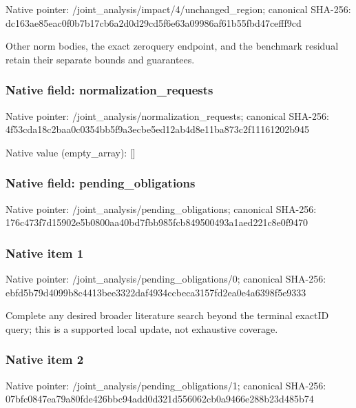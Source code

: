 \documentclass[10pt,a4paper]{article}
\begin{document}
Native pointer: /joint\_analysis/impact/4\allowbreak{}/unchanged\_region; canonical SHA-256: dc163ae85eac0f0b7b17cb6a\allowbreak{}2d0d29cd5f6e63a09986af61\allowbreak{}b55fbd47cefff9cd


Other norm bodies, the exact zeroquery endpoint, and the benchmark residual retain their separate bounds and guarantees.


\subsubsection{Native field: normalization\_requests}


Native pointer: /joint\_analysis/normalization\_requests; canonical SHA-256: 4f53cda18c2baa0c0354bb5f\allowbreak{}9a3ecbe5ed12ab4d8e11ba87\allowbreak{}3c2f11161202b945



Native value (empty\_array): []



\subsubsection{Native field: pending\_obligations}


Native pointer: /joint\_analysis/pending\_obligations; canonical SHA-256: 176c473f7d15902e5b0800aa\allowbreak{}40bd7fbb985fcb849500493a\allowbreak{}1aed221c8e0f9470



\subsubsection{Native item 1}


Native pointer: /joint\_analysis/pending\_obligations/0; canonical SHA-256: ebfd5b79d4099b8c4413bee3\allowbreak{}322daf4934ccbeca3157fd2e\allowbreak{}a0e4a6398f5e9333


Complete any desired broader literature search beyond the terminal exactID query; this is a supported local update, not exhaustive coverage.


\subsubsection{Native item 2}


Native pointer: /joint\_analysis/pending\_obligations/1; canonical SHA-256: 07bfc0847ea79a80fde426bb\allowbreak{}c94add0d321d556062cb0a94\allowbreak{}66e288b23d485b74
\end{document}
